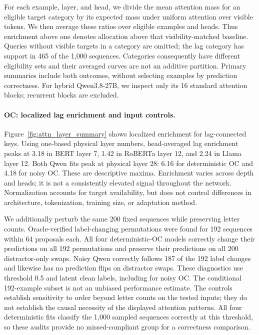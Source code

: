 \documentclass{article} %
\theoremstyle{plain}
\theoremstyle{definition}
\theoremstyle{remark}
\begin{document}
For each example, layer, and head, we divide the mean attention mass for an eligible target category by its expected mass under uniform attention over visible tokens. We then average these ratios over eligible examples and heads. Thus enrichment above one denotes allocation above that visibility-matched baseline. Queries without visible targets in a category are omitted; the lag category has support in 465 of the 1,000 sequences. Categories consequently have different eligibility sets and their averaged curves are not an additive partition. Primary summaries include both outcomes, without selecting examples by prediction correctness. For hybrid Qwen3.8-27B, we inspect only its 16 standard attention blocks; recurrent blocks are excluded.

\paragraph{OC: localized lag enrichment and input controls.}
Figure~\ref{fig:attn_layer_summary} shows localized enrichment for lag-connected keys. Using one-based physical layer numbers, head-averaged lag enrichment peaks at 3.18 in BERT layer 7, 1.42 in RoBERTa layer 12, and 2.24 in Llama layer 12. Both Qwen fits peak at physical layer 28: 6.16 for deterministic OC and 4.18 for noisy OC. These are descriptive maxima. Enrichment varies across depth and heads; it is not a consistently elevated signal throughout the network. Normalization accounts for target availability, but does not control differences in architecture, tokenization, training size, or adaptation method.

We additionally perturb the same 200 fixed sequences while preserving letter counts. Oracle-verified label-changing permutations were found for 192 sequences within 64 proposals each. All four deterministic-OC models correctly change their predictions on all 192 permutations and preserve their predictions on all 200 distractor-only swaps. Noisy Qwen correctly follows 187 of the 192 label changes and likewise has no prediction flips on distractor swaps. These diagnostics use
threshold 0.5 and latent clean labels, including for noisy OC. The conditional 192-example subset is not an unbiased performance estimate. The controls establish sensitivity to order beyond letter counts on the tested inputs; they do not establish the causal necessity of the displayed attention patterns. All four deterministic fits classify the 1,000 sampled sequences correctly at this threshold, so these audits provide no missed-compliant group for a correctness comparison.
\end{document}
